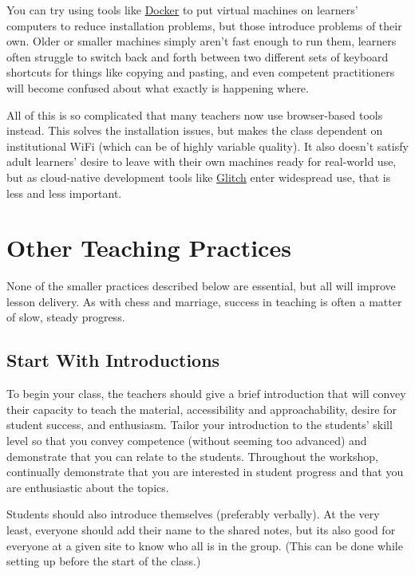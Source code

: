 You can try using tools like \href{http://docker.com}{Docker} to put
virtual machines on learners' computers to reduce installation
problems, but those introduce problems of their own.  Older or smaller
machines simply aren't fast enough to run them, learners often
struggle to switch back and forth between two different sets of
keyboard shortcuts for things like copying and pasting, and even
competent practitioners will become confused about what exactly is
happening where.

All of this is so complicated that many teachers now use browser-based
tools instead. This solves the installation issues, but makes the
class dependent on institutional WiFi (which can be of highly variable
quality).  It also doesn't satisfy adult learners' desire to leave
with their own machines ready for real-world use, but as cloud-native
development tools like \href{https://glitch.com/}{Glitch} enter
widespread use, that is less and less important.

\section{Other Teaching Practices}\label{s:classroom-practices}

None of the smaller practices described below are essential, but all
will improve lesson delivery.  As with chess and marriage, success in
teaching is often a matter of slow, steady progress.

\subsection*{Start With Introductions}

To begin your class, the teachers should give a brief introduction
that will convey their capacity to teach the material, accessibility
and approachability, desire for student success, and enthusiasm.
Tailor your introduction to the students' skill level so that you
convey competence (without seeming too advanced) and demonstrate that
you can relate to the students. Throughout the workshop, continually
demonstrate that you are interested in student progress and that you
are enthusiastic about the topics.

Students should also introduce themselves (preferably verbally). At
the very least, everyone should add their name to the shared notes,
but its also good for everyone at a given site to know who all is in
the group.  (This can be done while setting up before the start of the
class.)

